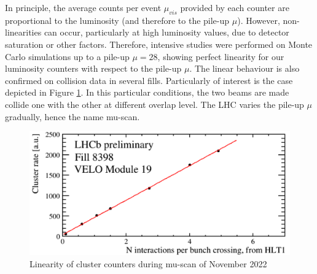 %
%
In principle, the average counts per event $\mu_{vis}$ provided by each counter are proportional to the luminosity (and therefore to the pile-up $\mu$). However, non-linearities can occur, particularly at high luminosity values, due to detector saturation or other factors. Therefore, intensive studies were performed on Monte Carlo simulations up to a pile-up $\mu = 28$, showing perfect linearity for our luminosity counters\cite{dan} with respect to the pile-up $\mu$. The linear behaviour is also confirmed on collision data in several fills. Particularly of interest is the case depicted in Figure \ref{fig:muscan}. In this particular conditions, the two beams are made collide one with the other at different overlap level. The LHC varies the pile-up $\mu$ gradually,  hence the name  mu-scan.

\begin{figure}
    \centering
    \includegraphics[width=\textwidth]{figures/muscan.png}
    \caption{Linearity of cluster counters during mu-scan of November 2022}
    \label{fig:muscan}
\end{figure}


